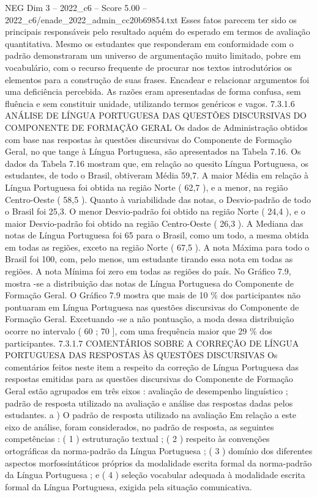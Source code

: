 \begin{textsample}{NEG Dim 3 – 2022\_c6 – Score 5.00 – 2022\_c6/enade\_2022\_admin\_cc20b69854.txt}
Esses fatos parecem ter sido os principais responsáveis pelo resultado aquém do esperado em termos de avaliação quantitativa.
Mesmo os estudantes que responderam em conformidade com o padrão demonstraram um universo de argumentação muito limitado, pobre em vocabulário, com o recurso frequente de procurar nos textos introdutórios os elementos para a construção de suas frases.
Encadear e relacionar argumentos foi uma deficiência percebida.
As razões eram apresentadas de forma confusa, sem fluência e sem constituir unidade, utilizando termos genéricos e vagos. 7.3.1.6 ANÁLISE DE LÍNGUA PORTUGUESA DAS QUESTÕES DISCURSIVAS DO COMPONENTE DE FORMAÇÃO GERAL Os dados de Administração obtidos com base nas respostas às questões discursivas do Componente de Formação Geral, no que tange à Língua Portuguesa, são apresentados na Tabela 7.16.
Os dados da Tabela 7.16 mostram que, em relação ao quesito Língua Portuguesa, os estudantes, de todo o Brasil, obtiveram Média 59,7.
A maior Média em relação à Língua Portuguesa foi obtida na região Norte ( 62,7 ), e a menor, na região Centro-Oeste ( 58,5 ).
Quanto à variabilidade das notas, o Desvio-padrão de todo o Brasil foi 25,3.
O menor Desvio-padrão foi obtido na região Norte ( 24,4 ), e o maior Desvio-padrão foi obtido na região Centro-Oeste ( 26,3 ).
A Mediana das notas de Língua Portuguesa foi 65 para o Brasil, como um todo, a mesma obtida em todas as regiões, exceto na região Norte ( 67,5 ).
A nota Máxima para todo o Brasil foi 100, com, pelo menos, um estudante tirando essa nota em todas as regiões.
A nota Mínima foi zero em todas as regiões do país.
No Gráfico 7.9, mostra -se a distribuição das notas de Língua Portuguesa do Componente de Formação Geral.
O Gráfico 7.9 mostra que mais de 10 \% dos participantes não pontuaram em Língua Portuguesa nas questões discursivas do Componente de Formação Geral.
Excetuando -se a não pontuação, a moda dessa distribuição ocorre no intervalo ( 60 ; 70 ], com uma frequência maior que 29 \% dos participantes. 7.3.1.7 COMENTÁRIOS SOBRE A CORREÇÃO DE LÍNGUA PORTUGUESA DAS RESPOSTAS ÀS QUESTÕES DISCURSIVAS Os comentários feitos neste item a respeito da correção de Língua Portuguesa das respostas emitidas para as questões discursivas do Componente de Formação Geral estão agrupados em três eixos : avaliação de desempenho linguístico ; padrão de resposta utilizado na avaliação e análise das respostas dadas pelos estudantes. a ) O padrão de resposta utilizado na avaliação Em relação a este eixo de análise, foram considerados, no padrão de resposta, as seguintes competências : ( 1 ) estruturação textual ; ( 2 ) respeito às convenções ortográficas da norma-padrão da Língua Portuguesa ; ( 3 ) domínio dos diferentes aspectos morfossintáticos próprios da modalidade escrita formal da norma-padrão da Língua Portuguesa ; e ( 4 ) seleção vocabular adequada à modalidade escrita formal da Língua Portuguesa, exigida pela situação comunicativa.

\end{textsample}
